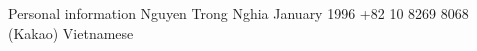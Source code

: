 \begin{rubric}{Personal information}
%
\entry*[Name]%
        Nguyen Trong Nghia
%
 January 1996
%
%
%
\entry*[Mobile]%
	+82 10 8269 8068 (Kakao)
%
\entry*[Nationality]%
	Vietnamese
%
\end{rubric}